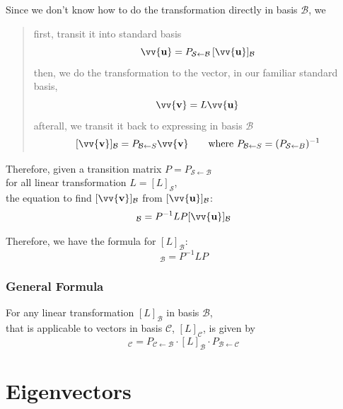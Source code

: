 \documentclass[11pt]{article}
\DeclareRobustCommand{\myvec}[1]{\vv{\mathbf{#1}}}
\newcommand{\myset}[1]{\mathcal{#1}}
\newcommand{\mymat}[1]{#1}
\begin{document}
    Since we don't know how to do the transformation directly in basis $\myset{B}$, we \\
    \begin{quote}
        first, transit it into standard basis
        \[ \myvec{u} = \mymat{P}_{\myset{S}\leftarrow\myset{B}}\,[\myvec{u}]_{\myset{B}} \]
        then, we do the transformation to the vector, in our familiar standard basis,
        \[ \myvec{v} = \mymat{L}\myvec{u} \]
        afterall, we transit it back to expressing in basis $\myset{B}$ \\
        \[ [\myvec{v}]_{\myset{B}} = \mymat{P}_{\myset{B}\leftarrow{S}} \myvec{v} \qquad \text{where } \mymat{P}_{\myset{B}\leftarrow{S}} = (\mymat{P}_{\myset{S}\leftarrow{B}})^{-1}\]
    \end{quote}
    Therefore, given a transition matrix $\mymat{P} = \mymat{P}_{\myset{S}\leftarrow\myset{B}}$ \\
    for all linear transformation $\mymat{L} = [\mymat{L}]_{\myset{S}}$,\\ 
    the equation to find $[\myvec{v}]_{\myset{B}}$ from $[\myvec{u}]_{\myset{B}}$:
    \begin{equation}
        [\myvec{v}]_{\myset{B}} = \mymat{P}^{-1} \mymat{L} \mymat{P} [\myvec{u}]_{\myset{B}}
    \end{equation}

    Therefore, we have the formula for $[\mymat{L}]_{\myset{B}}$:
    \begin{equation}
        [\mymat{L}]_{\myset{B}} = \mymat{P}^{-1} \mymat{L} \mymat{P}
    \end{equation}

    \subsubsection{General Formula}
    For any linear transformation $[\mymat{L}]_{\myset{B}}$ in basis $\myset{B}$, \\
    that is applicable to vectors in basis $\myset{C}$, $[\mymat{L}]_{\myset{C}}$, is given by
    \begin{equation}
        [\mymat{L}]_{\myset{C}} = \mymat{P}_{\myset{C}\leftarrow\myset{B}} \cdot [\mymat{L}]_{\myset{B}} \cdot \mymat{P}_{\myset{B}\leftarrow\myset{C}}
    \end{equation}
    
    \newpage
    \section{Eigenvectors}
\end{document}
